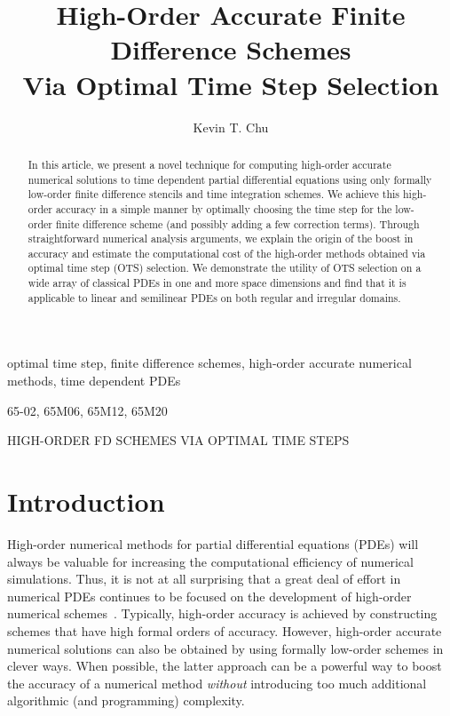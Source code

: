 \documentclass[oneeqnum,onefignum,onetabnum,onethmnum]{siamltex}
\title{High-Order Accurate Finite Difference Schemes \\
       Via Optimal Time Step Selection}
\author{
Kevin T. Chu\footnotemark[2] \footnotemark[3]
}
\begin{document}

\maketitle

\renewcommand{\thefootnote}{\fnsymbol{footnote}}

\renewcommand{\thefootnote}{\fnsymbol{footnote}}

\renewcommand{\thefootnote}{\arabic{footnote}}


\begin{abstract}
In this article, we present a novel technique for computing high-order
accurate numerical solutions to time dependent partial differential 
equations using only formally low-order finite difference stencils and
time integration schemes.  We achieve this high-order accuracy in a simple 
manner by optimally choosing the time step for the low-order finite 
difference scheme (and possibly adding a few correction terms).  Through 
straightforward numerical analysis arguments, we explain the origin of the 
boost in accuracy and estimate the computational cost of the high-order 
methods obtained via optimal time step (OTS) selection.  We demonstrate the 
utility of OTS selection on a wide array of classical PDEs in one and more 
space dimensions and find that it is applicable to linear and semilinear PDEs 
on both regular and irregular domains. 
\end{abstract}


\begin{keywords}
optimal time step, finite difference schemes, high-order accurate numerical 
methods, time dependent PDEs
\end{keywords}

\begin{AMS}
65-02, 65M06, 65M12, 65M20
\end{AMS}

\pagestyle{myheadings}
\thispagestyle{plain}
         {HIGH-ORDER FD SCHEMES VIA OPTIMAL TIME STEPS}


\section*{Introduction}
High-order numerical methods for partial differential equations (PDEs) will 
always be valuable for increasing the computational efficiency of numerical 
simulations.  Thus, it is not at all surprising that a great deal of effort in 
numerical PDEs continues to be focused on the development of high-order 
numerical schemes~\cite{bruger_2005, gibou_2005, ito_2005, shukla_2005, 
shukla_2007}.  
Typically, high-order accuracy is achieved by constructing
schemes that have high formal orders of accuracy.  However, high-order 
accurate numerical solutions can also be obtained by using formally low-order 
schemes in clever ways.  When possible, the latter approach can be a powerful 
way to boost the accuracy of a numerical method \emph{without} introducing too 
much additional algorithmic (and programming) complexity.
\end{document}
